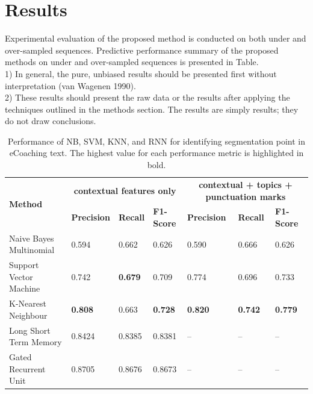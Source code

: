 \documentclass{amia}
\begin{document}
\section*{Results}
Experimental evaluation of the proposed method is conducted on both under and over-sampled sequences. Predictive performance summary of the proposed methods on under and over-sampled sequences is presented in Table.\\

1) In general, the pure, unbiased results should be presented first without interpretation (van Wagenen 1990). \\
2) These results should present the raw data
or the results after applying the techniques outlined in the methods section. The results are simply results; they do not draw conclusions.\\

\begin{table}[ht]
\centering
\caption{Performance of NB, SVM, KNN, and RNN for identifying segmentation point in eCoaching text. The highest value for each performance metric is highlighted in bold.}
\label{tab:result_under_over_sampled}
  \begin{tabular}{|l|l|l|l|l|l|l|}
  \hline
   \multirow{2}{*}{\textbf{Method}} & \multicolumn{3}{|c|}{\textbf{contextual features only}} & \multicolumn{3}{|c|}{\textbf{contextual + topics + punctuation marks}} \\\cline{2-7}
   & \textbf{Precision}  & \textbf{Recall} & \textbf{F1-Score} & \textbf{Precision}  & \textbf{Recall} & \textbf{F1-Score}\\ \hline    
    
 Naive Bayes Multinomial & 0.594 & 0.662 & 0.626 & 0.590 & 0.666 & 0.626 \\ \hline
 Support Vector Machine & 0.742 & \textbf{0.679} & 0.709 & 0.774 & 0.696 & 0.733\\ \hline
 K-Nearest Neighbour & \textbf{0.808} & 0.663 & \textbf{0.728} & \textbf{0.820} & \textbf{0.742} & \textbf{0.779}\\ \hline
 Long Short Term Memory & 0.8424 & 0.8385 & 0.8381  & -- & -- & --\\ \hline
 Gated Recurrent Unit & 0.8705 & 0.8676 & 0.8673 & -- & -- & --\\ \hline 
  \end{tabular}
\end{table} 
\end{document}
